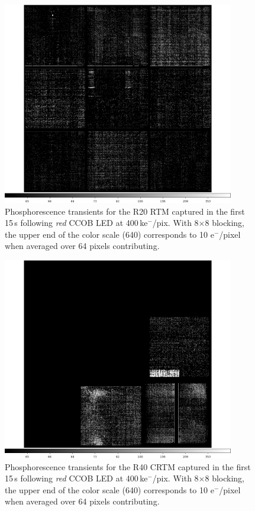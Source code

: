\begin{figure}[!htbp]
\centering
\includegraphics[width=0.9\textwidth]{sections/figures/phosphorescence-survey/itl_fluor_R20_0-19_rb1_log.png}
\caption{Phosphorescence transients for the R20 RTM captured in the first 15\,s following {\it red} CCOB LED at 400\,ke$^-$/pix. With 8$\times$8 blocking, the upper end of the color scale (640) corresponds to 10 e$^-$/pixel when averaged over 64 pixels contributing.}
\label{fig:phos:R20}
\end{figure}

\begin{figure}[!htbp]
\centering
\includegraphics[width=0.9\textwidth]{sections/figures/phosphorescence-survey/itl_fluor_R40_0-19_rb1_log.png}
\caption{Phosphorescence transients for the R40 CRTM captured in the first 15\,s following {\it red} CCOB LED at 400\,ke$^-$/pix. With 8$\times$8 blocking, the upper end of the color scale (640) corresponds to 10 e$^-$/pixel when averaged over 64 pixels contributing.}
\label{fig:phos:R40}
\end{figure}

